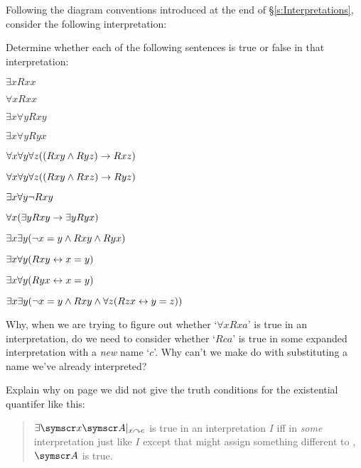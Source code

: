 \begin{earg}
\problempart
Following the diagram conventions introduced at the end of §\ref{s:Interpretations}, consider the following interpretation:	
\begin{center}
\end{center}
Determine whether each of the following sentences is true or false in that interpretation:
\begin{earg}
\item $\exists x Rxx$
\item $\forall x Rxx$
\item $\exists x \forall y Rxy$
\item $\exists x \forall y Ryx$
\item $\forall x \forall y \forall z ((Rxy \wedge Ryz) \rightarrow Rxz)$
\item $\forall x \forall y \forall z ((Rxy \wedge Rxz) \rightarrow Ryz)$
\item $\exists x \forall y \neg Rxy$
\item $\forall x(\exists y Rxy \rightarrow \exists y Ryx)$
\item $\exists x \exists y (\neg x = y \wedge Rxy \wedge Ryx)$
\item $\exists x \forall y(Rxy \leftrightarrow x = y)$
\item $\exists x \forall y(Ryx \leftrightarrow x = y)$
\item $\exists x \exists y(\neg x = y \wedge Rxy \wedge \forall z(Rzx \leftrightarrow y = z))$
\end{earg}

\problempart
Why, when we are trying to figure out whether `$\forall x Rxa$' is true in an interpretation, do we need to consider whether `$Rca$' is true in some expanded interpretation with a \emph{new} name `$c$'. Why can't we make do with substituting a name we've already interpreted?

\problempart
Explain why on page \pageref{quant.tcs.precise} we did not give the truth conditions for the existential quantifer like this: \begin{quote}
	$\exists\meta{x}\meta{A}\subs{x}{c}$ is true in an interpretation $I$ iff in \emph{some} interpretation just like $I$ except that might assign something different to , $\meta{A}$ is true.
\end{quote}







\end{earg}
